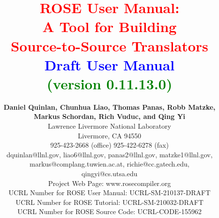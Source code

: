 \documentclass[10pt]{book}
\begin{document}
\title{ {\bf \textcolor{red}{         ROSE User Manual: \\ 
                                     A Tool for Building \\
                                Source-to-Source Translators} \\
                             \textcolor{blue}{Draft User Manual} \\
                               \textcolor{green}{(version 0.11.13.0)} } }

\author{ {\bf Daniel Quinlan, Chunhua Liao, Thomas Panas, Robb Matzke,} \\
         {\bf Markus Schordan, Rich Vuduc, and Qing Yi} \\
         Lawrence Livermore National Laboratory \\ 
         Livermore, CA  94550 \\
         925-423-2668 (office)  925-422-6278 (fax) \\
         dquinlan@llnl.gov, liao6@llnl.gov, panas2@llnl.gov, matzke1@llnl.gov, \\ 
         markus@complang.tuwien.ac.at, richie@cc.gatech.edu, \\
         qingyi@cs.utsa.edu \\
         Project Web Page: www.rosecompiler.org \\
         UCRL Number for ROSE User Manual: UCRL-SM-210137-DRAFT \\
         UCRL Number for ROSE Tutorial: UCRL-SM-210032-DRAFT \\
         UCRL Number for ROSE Source Code: UCRL-CODE-155962 \\
          \\
}
\end{document}
